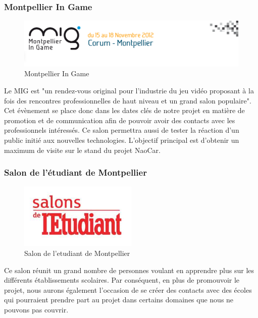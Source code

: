 \documentclass[11pt]{report} %
\begin{document}
			\subsubsection{Montpellier In Game}
				\begin{figure}[htb]
				\centering
				\includegraphics[width=1\textwidth]{mig.png}
				\caption{Montpellier In Game}
				\label{fig:Montpellier In Game}
				\end{figure}
	                        Le MIG est "un rendez-vous original pour l’industrie du jeu vidéo proposant à la fois des rencontres professionnelles de haut niveau et un grand salon populaire". \\Cet évènement se place donc dans les dates clés de notre projet en matière de promotion et de communication afin de pouvoir avoir des contacts avec les professionnels intéressés. Ce salon permettra aussi de tester la réaction d'un public initié aux nouvelles technologies.
			L'objectif principal est d'obtenir un maximum de visite sur le stand du projet NaoCar.
		\newpage
	                \subsubsection{Salon de l'étudiant de Montpellier}
				\begin{figure}[htb]
				\centering
				\includegraphics[width=0.5\textwidth]{salon-de-l-enseignement-superieur-de-montpellier.jpg}
				\caption{Salon de l'etudiant de Montpellier}
				\label{fig:Salon de l'etudiant de Montpellier}
				\end{figure}
				Ce salon réunit un grand nombre de personnes voulant en apprendre plus sur les différents établissements scolaires. Par conséquent, en plus de promouvoir le projet, nous aurons également l'occasion de se créer des contacts avec des écoles qui pourraient prendre part au projet dans certains domaines que nous ne pouvons pas couvrir.
\end{document}
